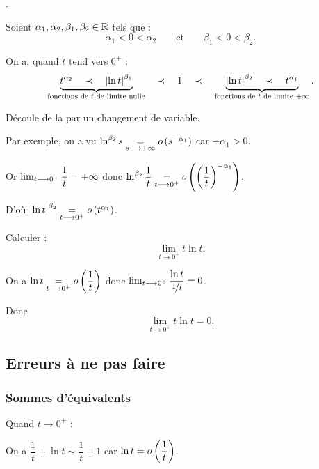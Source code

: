\begin{dem}
\Cf {}.
\end{dem}

\begin{prop}
Soient \(\alpha_1,\alpha_2,\beta_1,\beta_2\in\R\) tels que : \[\alpha_1<0<\alpha_2\qquad\text{et}\qquad\beta_1<0<\beta_2.\]

On a, quand \(t\) tend vers \(0^+\) : \[\underbrace{t^{\alpha_2}\quad\prec\quad\abs{\ln t}^{\beta_1}}_{\text{fonctions de }t\text{ de limite nulle}}\quad\prec\quad1\quad\prec\quad\underbrace{\abs{\ln t}^{\beta_2}\quad\prec\quad t^{\alpha_1}}_{\text{fonctions de }t\text{ de limite }\pinf}.\]
\end{prop}

\begin{dem}
Découle de la  par un changement de variable.

Par exemple, on a vu \(\ln^{\beta_2}s\egqd{s\to\pinf}\o{s^{-\alpha_1}}\) car \(-\alpha_1>0\).

Or \(\lim_{t\to0^+}\dfrac{1}{t}=\pinf\) donc \(\ln^{\beta_2}\dfrac{1}{t}\egqd{t\to0^+}\o{\paren{\dfrac{1}{t}}^{-\alpha_1}}\).

D'où \(\abs{\ln t}^{\beta_2}\egqd{t\to0^+}\o{t^{\alpha_1}}\).
\end{dem}

\begin{exoex}
Calculer : \[\lim_{t\to0^+}t\ln t.\]
\end{exoex}

\begin{corr}
On a \(\ln t\egqd{t\to0^+}\o{\dfrac{1}{t}}\) donc \(\lim_{t\to0^+}\dfrac{\ln t}{\nicefrac{1}{t}}=0\).

Donc \[\lim_{t\to0^+}t\ln t=0.\]
\end{corr}

\subsection{Erreurs à ne pas faire}

\subsubsection{Sommes d'équivalents}

Quand \(t\to0^+\) :

On a \(\dfrac{1}{t}+\ln t\sim\dfrac{1}{t}+1\) car \(\ln t=\o{\dfrac{1}{t}}\).


